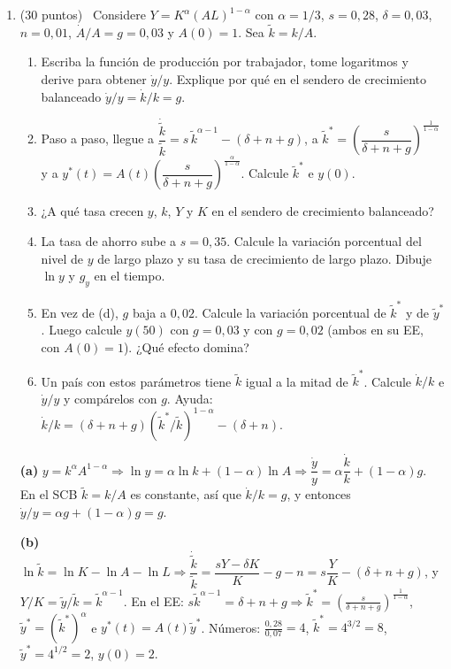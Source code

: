 \documentclass[12pt,letterpaper]{article}
\newcommand{\oblig}[1]{\fbox{\footnotesize\textbf{OBLIGATORIO} · $p\approx #1$}\,}
\begin{document}
\begin{enumerate}[label=\arabic*.,leftmargin=1.6em,itemsep=0.8em]
\item (30 puntos) \oblig{0{,}90} Considere $Y=K^{\alpha}(AL)^{1-\alpha}$ con $\alpha=1/3$, $s=0{,}28$, $\delta=0{,}03$, $n=0{,}01$, $\dot A/A=g=0{,}03$ y $A(0)=1$. Sea $\tilde k=k/A$.
\begin{enumerate}[label=(\alph*)]
\item Escriba la función de producción por trabajador, tome logaritmos y derive para obtener $\dot y/y$. Explique por qué en el sendero de crecimiento balanceado $\dot y/y=\dot k/k=g$.
\item Paso a paso, llegue a $\dfrac{\dot{\tilde k}}{\tilde k}=s\,\tilde k^{\alpha-1}-(\delta+n+g)$, a $\tilde k^*=\left(\dfrac{s}{\delta+n+g}\right)^{\frac{1}{1-\alpha}}$ y a $y^*(t)=A(t)\left(\dfrac{s}{\delta+n+g}\right)^{\frac{\alpha}{1-\alpha}}$. Calcule $\tilde k^*$ e $y(0)$.
\item ¿A qué tasa crecen $y$, $k$, $Y$ y $K$ en el sendero de crecimiento balanceado?
\item La tasa de ahorro sube a $s=0{,}35$. Calcule la variación porcentual del nivel de $y$ de largo plazo y su tasa de crecimiento de largo plazo. Dibuje $\ln y$ y $g_y$ en el tiempo.
\item En vez de (d), $g$ baja a $0{,}02$. Calcule la variación porcentual de $\tilde k^*$ y de $\tilde y^*$. Luego calcule $y(50)$ con $g=0{,}03$ y con $g=0{,}02$ (ambos en su EE, con $A(0)=1$). ¿Qué efecto domina?
\item Un país con estos parámetros tiene $\tilde k$ igual a la mitad de $\tilde k^*$. Calcule $\dot k/k$ e $\dot y/y$ y compárelos con $g$. Ayuda: $\dot k/k=(\delta+n+g)\left(\tilde k^*/\tilde k\right)^{1-\alpha}-(\delta+n)$.
\end{enumerate}
\begin{resp}
\textbf{(a)} $y=k^{\alpha}A^{1-\alpha}\Rightarrow \ln y=\alpha\ln k+(1-\alpha)\ln A\Rightarrow \dfrac{\dot y}{y}=\alpha\dfrac{\dot k}{k}+(1-\alpha)g$. En el SCB $\tilde k=k/A$ es constante, así que $\dot k/k=g$, y entonces $\dot y/y=\alpha g+(1-\alpha)g=g$.

\textbf{(b)} $\ln\tilde k=\ln K-\ln A-\ln L\Rightarrow \dfrac{\dot{\tilde k}}{\tilde k}=\dfrac{sY-\delta K}{K}-g-n=s\dfrac{Y}{K}-(\delta+n+g)$, y $Y/K=\tilde y/\tilde k=\tilde k^{\alpha-1}$. En el EE: $s\tilde k^{\alpha-1}=\delta+n+g\Rightarrow \tilde k^*=\left(\frac{s}{\delta+n+g}\right)^{\frac1{1-\alpha}}$, $\tilde y^*=(\tilde k^*)^{\alpha}$ e $y^*(t)=A(t)\tilde y^*$. Números: $\frac{0{,}28}{0{,}07}=4$, $\tilde k^*=4^{3/2}=8$, $\tilde y^*=4^{1/2}=2$, $y(0)=2$.


\end{resp}
\end{enumerate}
\end{document}

